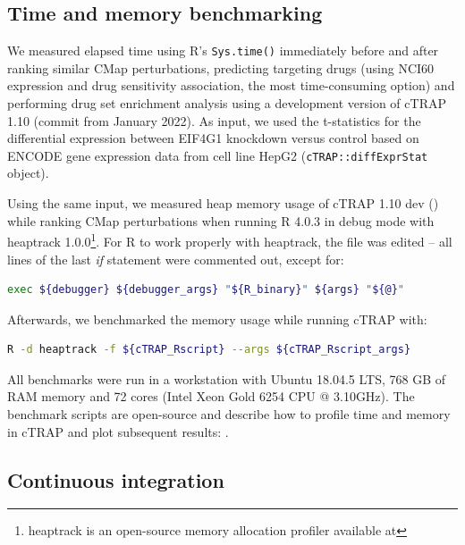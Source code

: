 \subsection{Time and memory benchmarking}

We measured elapsed time using R’s \texttt{Sys.time()} immediately before and after ranking similar CMap perturbations, predicting targeting drugs (using NCI60 expression and drug sensitivity association, the most time-consuming option) and performing drug set enrichment analysis using a development version of cTRAP 1.10 (commit  from January 2022). As input, we used the t-statistics for the differential expression between EIF4G1 knockdown versus control based on ENCODE gene expression data from cell line HepG2 (\texttt{cTRAP::diffExprStat} object).

Using the same input, we measured heap memory usage of cTRAP 1.10 dev () while ranking CMap perturbations when running R 4.0.3 in debug mode with heaptrack 1.0.0\footnote{heaptrack is an open-source memory allocation profiler available at }. For R to work properly with heaptrack, the  file was edited -- all lines of the last \emph{if} statement were commented out, except for:

\begin{lstlisting}[language=bash,numbers=none]
exec ${debugger} ${debugger_args} "${R_binary}" ${args} "${@}"
\end{lstlisting}

Afterwards, we benchmarked the memory usage while running cTRAP with:

\begin{lstlisting}[language=bash,numbers=none]
R -d heaptrack -f ${cTRAP_Rscript} --args ${cTRAP_Rscript_args}
\end{lstlisting}

All benchmarks were run in a workstation with Ubuntu 18.04.5 LTS, 768 GB of RAM memory and 72 cores (Intel Xeon Gold 6254 CPU @ 3.10GHz). The benchmark scripts are open-source and describe how to profile time and memory in cTRAP and plot subsequent results: .

\subsection{Continuous integration}

